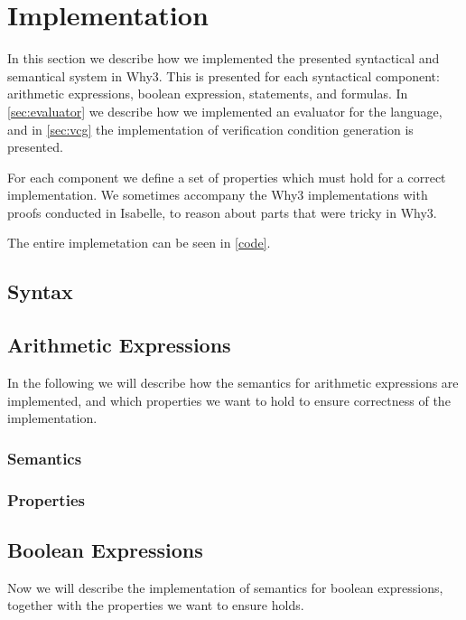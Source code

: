 \section{Implementation}\label{sec:implementation}
In this section we describe how we implemented the presented syntactical and semantical system
in Why3. This is presented for each syntactical component: arithmetic expressions, boolean expression, statements, and formulas. In \ref{sec:evaluator} we describe how we implemented
an evaluator for the language, and in \ref{sec:vcg} the implementation of verification
condition generation is presented.

For each component we define a set of properties which must hold for a correct implementation.
We sometimes accompany the Why3 implementations with proofs conducted in Isabelle, to reason
about parts that were tricky in Why3.

The entire implemetation can be seen in \cref{code}.

\subsection{Syntax}


\subsection{Arithmetic Expressions}
In the following we will describe how the semantics for arithmetic expressions are implemented,
and which properties we want to hold to ensure correctness of the implementation.

\subsubsection{Semantics}


\subsubsection{Properties}\label{sec:aprops}


\subsection{Boolean Expressions}
Now we will describe the implementation of semantics for boolean expressions, together with
the properties we want to ensure holds.



